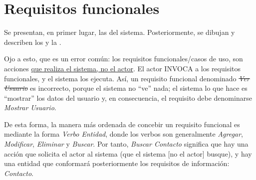 \section{\forlnameref Requisitos funcionales}
\label{sec:functionalReqs}

Se presentan, en primer lugar, las  del sistema. Posteriormente, se dibujan y describen los  y la .

\begin{shaded}
Ojo a esto, que es un error común: los requisitos funcionales/casos de uso, son acciones \underline{que realiza el sistema, no el actor}. El actor INVOCA a los requisitos funcionales, y el sistema los ejecuta. Así, un requisito funcional denominado \sout{\textit{Ver Usuario}} es incorrecto, porque el sistema no ``ve'' nada; el sistema lo que hace es ``mostrar'' los datos del usuario y, en consecuencia, el requisito debe denominarse \textit{Mostrar Usuario}.

De esta forma, la manera más ordenada de concebir un requisito funcional es mediante la forma \textit{Verbo Entidad}, donde los verbos son generalmente \textit{Agregar}, \textit{Modificar}, \textit{Eliminar} y \textit{Buscar}. Por tanto, \textit{Buscar Contacto} significa que hay una acción que solicita el actor al sistema (que el sistema [no el actor] busque), y hay una entidad que conformará posteriormente los requisitos de información: \textit{Contacto}.
\end{shaded}

